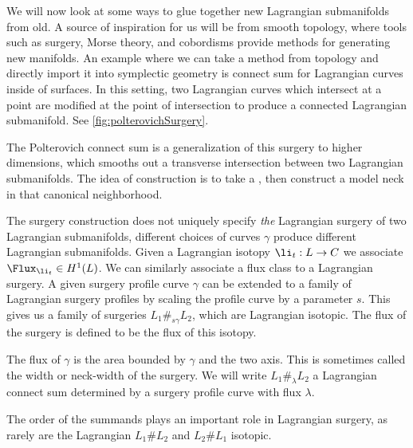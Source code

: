 
We will now look at some ways to glue together new Lagrangian submanifolds from old.
A source of inspiration for us will be from smooth topology, where tools such as surgery, Morse theory, and cobordisms provide methods for generating new manifolds.
An example where we can take a method from topology and directly import it into symplectic geometry is connect sum for Lagrangian curves inside of surfaces.
In this setting, two Lagrangian curves which intersect at a point are modified at the point of intersection to produce a connected Lagrangian submanifold.
See \cref{fig:polterovichSurgery}.

The Polterovich connect sum is a generalization of this surgery to higher dimensions, which smooths out a transverse intersection between two Lagrangian submanifolds. 
The idea of construction is to take a  , then construct a model neck in that canonical neighborhood. 



The surgery construction does not uniquely specify \emph{the} Lagrangian surgery of two Lagrangian submanifolds,  different choices of curves $\gamma$ produce different Lagrangian submanifolds.
Given a Lagrangian isotopy $\li_t: L\to C$ we associate  $\Flux_{\li_t}\in H^1(L)$. 
We can similarly associate a flux class to a Lagrangian surgery.
A given surgery profile curve $\gamma$ can be extended to a family of Lagrangian surgery profiles by scaling the profile curve by a parameter $s$.  
This gives us a family of surgeries $L_1\#_{s\gamma} L_2$, which are Lagrangian isotopic.
The flux of the surgery is defined to be the flux of this isotopy. 

The flux of $\gamma$ is the area bounded by $\gamma$ and the two axis. This is sometimes called the width or neck-width of the surgery.
We will write $L_1\#_{\lambda}L_2$ a Lagrangian connect sum determined by a surgery profile curve with flux $\lambda$.

The order of the summands plays an important role in Lagrangian surgery, as rarely are the Lagrangian $L_1\#L_2$ and $L_2\#L_1$ isotopic. 


